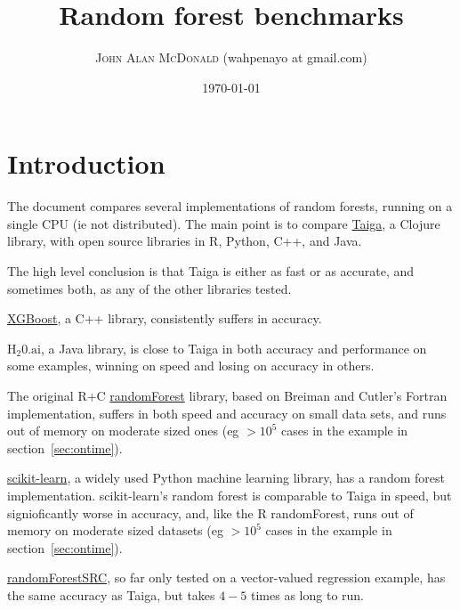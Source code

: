 \documentclass[10pt]{article}
\title{Random forest benchmarks}
\author{\textsc{John Alan McDonald} (wahpenayo at gmail.com)}
\date{\today}
\begin{document}
\maketitle




\def\dollar{\text{\$}}    

\section{Introduction}
The document compares several implementations of random forests,
running on a single CPU (ie not distributed).
The main point is to compare 
\href{https://github.com/wahpenayo/taiga/tree/master}{Taiga},
a Clojure library, with open source libraries in
R, Python, C++, and Java.

The high level conclusion is that Taiga is either as fast or as
accurate, and sometimes both, as any of the other libraries tested.

\href{https://xgboost.readthedocs.io/en/latest/}{XGBoost}, a C++
library, consistently suffers in accuracy.

\href{http://www.h2o.ai/}{$\mathrm{H_{2}0.ai}$}, a Java library, is
close to Taiga in both accuracy and performance on some examples,
winning on speed and losing on accuracy in others.

The original R+C 
\href{https://cran.r-project.org/web/packages/randomForest/randomForest.pdf}{randomForest}
library, based on Breiman and Cutler's Fortran implementation,
suffers in both speed and accuracy on small data sets,
and runs out of memory on moderate sized ones (eg $>10^5$ cases in the
example in section~\ref{sec:ontime}).

\href{http://scikit-learn.org/stable/}{scikit-learn}, a widely used
Python machine learning library, has a random forest implementation.
scikit-learn's random forest is comparable to Taiga in speed, 
but signioficantly worse in accuracy, and, like the R randomForest, runs
out of memory on moderate sized datasets (eg $>10^5$ cases in the
example in section~\ref{sec:ontime}).

\href{https://cran.r-project.org/web/packages/randomForestSRC/index.html}{randomForestSRC},
so far only tested on a vector-valued regression example, has the same accuracy as Taiga, but takes
$4-5$ times as long to run.
\end{document}
